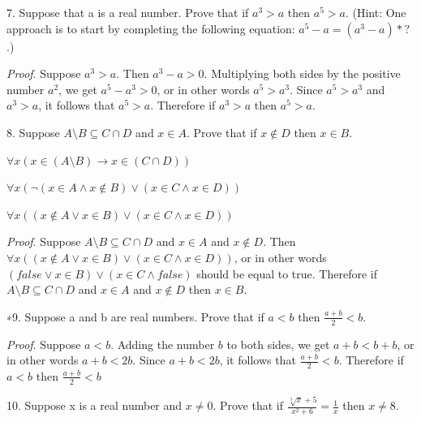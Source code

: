\documentclass{article}
\begin{document}
\vspace{30pt}

7. Suppose that a is a real number. Prove that if $a^3 > a$ then $a^5 > a$. (Hint:
One approach is to start by completing the following equation: $a^5 - a = (a^3 - a) * ?$ .)

\vspace{20pt}

\textit{Proof}. Suppose $a^3 > a$. Then $a^3 - a > 0$.
Multiplying both sides by the positive number $a^2$, we get $a^5 - a^3 > 0$, or in other words $a^5 > a^3$.
Since $a^5 > a^3$ and $a^3 > a$, it follows that $a^5 > a$. Therefore if $a^3 > a$ then $a^5 > a$.

\vspace{30pt}

8. Suppose $A \setminus B \subseteq C \cap D$ and $x \in A$. Prove that if $x \notin D$ then $x \in B$.

\vspace{20pt}

$\forall x (x \in (A \setminus B) \to x \in (C \cap D))$

$\forall x (\neg (x \in A \land x \notin B) \lor (x \in C \land x \in D))$

$\forall x ((x \notin A \lor x \in B) \lor (x \in C \land x \in D))$
\vspace{20pt}

\textit{Proof}. Suppose $A \setminus B \subseteq C \cap D$ and $x \in A$ and $x \notin D$.
Then $\forall x ((x \notin A \lor x \in B) \lor (x \in C \land x \in D))$, or in other words
$(false \lor x \in B) \lor (x \in C \land false)$ should be equal to true.
Therefore if $A \setminus B \subseteq C \cap D$ and $x \in A$ and $x \notin D$ then $x \in B$.


\vspace{30pt}

∗9. Suppose a and b are real numbers. Prove that if $a < b$ then $\frac{a+b}{2} < b$.

\vspace{20pt}

\textit{Proof}. Suppose $a < b$. Adding the number $b$ to both sides, we get $a + b < b + b$, or in other words
$a + b < 2b$. Since $a + b < 2b$, it follows that $\frac{a+b}{2} < b$. Therefore if $a < b$ then $\frac{a+b}{2} < b$

\vspace{30pt}

10. Suppose x is a real number and $x \neq 0$. Prove that if $\frac{\sqrt[3]{x} + 5}{x^2 + 6} = \frac{1}{x}$
then $x \neq 8$.
\end{document}
